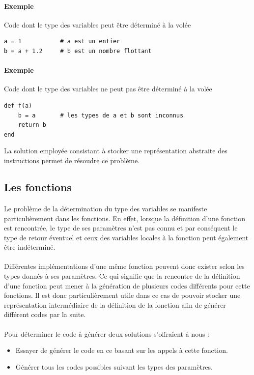 \documentclass[12pt]{article}
\begin{document}
\paragraph{Exemple} Code dont le type des variables peut être déterminé à la volée
\begin{verbatim}
a = 1           # a est un entier
b = a + 1.2     # b est un nombre flottant
\end{verbatim}

\paragraph{Exemple} Code dont le type des variables ne peut pas être déterminé à la volée
\begin{verbatim}
def f(a)
    b = a       # les types de a et b sont inconnus
    return b
end 
\end{verbatim}

La solution employée consistant à stocker une représentation abstraite des instructions permet de résoudre ce problème.

\subsection{Les fonctions}

\paragraph{}Le problème de la détermination du type des variables se manifeste particulièrement dans les fonctions. En effet, lorsque la définition d'une fonction est rencontrée, le type de ses paramètres n'est pas connu et par conséquent le type de retour éventuel et ceux des variables locales à la fonction peut également être indéterminé.

\paragraph{}Différentes implémentations d'une même fonction peuvent donc exister selon les types donnés à ses paramètres. Ce qui signifie que la rencontre de la définition d'une fonction peut mener à la génération de plusieurs codes différents pour cette fonctions. Il est donc particulièrement utile dans ce cas de pouvoir stocker une représentation intermédiaire de la définition de la fonction afin de générer différent codes par la suite.

\paragraph{}Pour déterminer le code à générer deux solutions s'offraient à nous :
\begin{itemize}
	\item Essayer de générer le code en ce basant sur les appels à cette fonction. 
	\item Générer tous les codes possibles suivant les types des paramètres.
\end{itemize}
\end{document}
